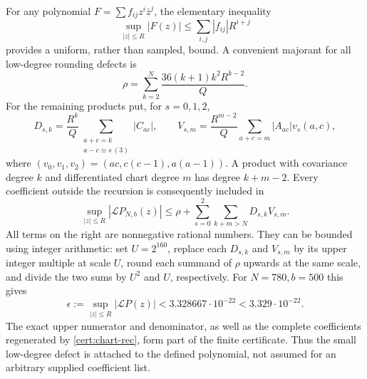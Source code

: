 \documentclass[11pt]{article}
\numberwithin{equation}{section}
\theoremstyle{definition}
\theoremstyle{remark}
\begin{document}
For any polynomial $F=\sum f_{ij}z^i\bar z^j$, the elementary inequality
\begin{equation}\label{cert:absolute-majorant}
 \sup_{|z|\leq R}|F(z)|\leq\sum_{i,j}|f_{ij}|R^{i+j}
\end{equation}
provides a uniform, rather than sampled, bound.  A convenient majorant for
all low-degree rounding defects is
\[
 \rho=\sum_{k=2}^N\frac{36(k+1)k^2R^{k-2}}Q.
\]
For the remaining products put, for $s=0,1,2$,
\[
 D_{s,k}=\frac{R^k}{Q}\sum_{\substack{a+c=k\\a-c\equiv s\ (3)}}|C_{ac}|,
 \qquad
 V_{s,m}=\frac{R^{m-2}}Q\sum_{a+c=m}|A_{ac}|v_s(a,c),
\]
where $(v_0,v_1,v_2)=(ac,c(c-1),a(a-1))$.  A product with covariance
degree $k$ and differentiated chart degree $m$ has degree $k+m-2$.
Every coefficient outside the recursion is consequently included in
\begin{equation}\label{cert:residual-sum}
 \sup_{|z|\leq R}|\mathcal L P_{N,b}(z)|
 \leq\rho+\sum_{s=0}^2\sum_{k+m>N}D_{s,k}V_{s,m}.
\end{equation}
All terms on the right are nonnegative rational numbers.  They can be
bounded using integer arithmetic: set $U=2^{160}$, replace each $D_{s,k}$
and $V_{s,m}$ by its upper integer multiple at scale $U$, round each
summand of $\rho$ upwards at the same scale, and divide the two sums by
$U^2$ and $U$, respectively.  For $N=780,b=500$ this gives
\begin{equation}\label{cert:epsilon}
 \epsilon:=\sup_{|z|\leq R}|\mathcal L P(z)|
      <3.328667\cdot10^{-22}<3.329\cdot10^{-22}.
\end{equation}
The exact upper numerator and denominator, as well as the complete
coefficients regenerated by \eqref{cert:chart-rec}, form part of the finite
certificate.  Thus the small low-degree defect is attached to the defined
polynomial, not assumed for an arbitrary supplied coefficient list.
\end{document}
